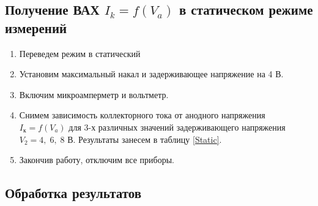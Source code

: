  	\subsection*{Получение ВАХ $I_k = f(V_a)$ в статическом режиме измерений}

 
 	\begin{enumerate}
 		\item Переведем режим в статический
 		
 		\item Установим максимальный накал и задерживающее напряжение на 4 В.
 		
 		\item Включим микроамперметр и вольтметр.
 		
 		\item Снимем зависимость коллекторного тока от анодного напряжения $I_\text{к} = f(V_a)$ для 3-х различных значений задерживающего напряжения $V_2 = 4, \; 6, \; 8$ В. Результаты занесем в таблицу \ref{Static}.
 		
 		\item Закончив работу, отключим все приборы.
 	\end{enumerate}
 
 	\newpage
 	
 	\subsection*{Обработка результатов}
 	
